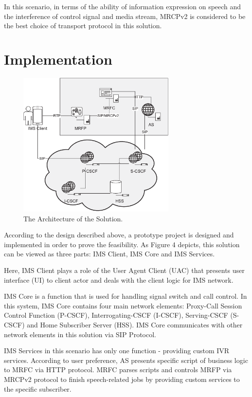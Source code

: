 \documentclass[10pt, conference, a4paper]{IEEEtran}
\begin{document}
In this scenario, in terms of the ability of information expression on speech and the interference of control signal and media stream, MRCPv2 is considered to be the best choice of transport protocol in this solution.

\section{Implementation}

\begin{figure}[!t]
\centering
\includegraphics[width=3.1in]{architecture.eps}
\caption{The Architecture of the Solution.}
\end{figure}

According to the design described above, a prototype project is designed and implemented in order to prove the feasibility. As Figure 4 depicts, this solution can be viewed as three parts: IMS Client, IMS Core and IMS Services.

Here, IMS Client plays a role of the User Agent Client (UAC) that presents user interface (UI) to client actor and deals with the client logic for IMS network. 

IMS Core is a function that is used for handling signal switch and call control. In this system, IMS Core contains four main network elements: Proxy-Call Session Control Function (P-CSCF), Interrogating-CSCF (I-CSCF), Serving-CSCF (S-CSCF) and Home Subscriber Server (HSS)\cite{book:softswitch.and.ims.technology}. IMS Core communicates with other network elements in this solution via SIP Protocol.

IMS Services in this scenario has only one function - providing custom IVR services. According to user preference, AS presents specific script of business logic to MRFC via HTTP protocol. MRFC parses scripts and controls MRFP via MRCPv2 protocol to finish speech-related jobs by providing custom services to the specific subscriber.
\end{document}
